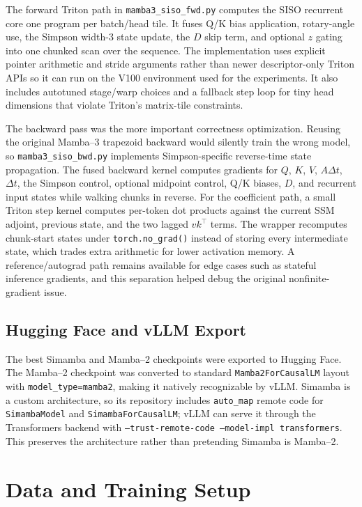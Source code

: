\documentclass[conference]{IEEEtran}
\newcommand{\modelname}{Simamba\xspace}
\newcommand{\mambatwo}{Mamba--2\xspace}
\newcommand{\mambathree}{Mamba--3\xspace}
\begin{document}
The forward Triton path in \texttt{mamba3\_siso\_fwd.py} computes the SISO recurrent core one program per batch/head tile. It fuses Q/K bias application, rotary-angle use, the Simpson width-3 state update, the $D$ skip term, and optional $z$ gating into one chunked scan over the sequence. The implementation uses explicit pointer arithmetic and stride arguments rather than newer descriptor-only Triton APIs so it can run on the V100 environment used for the experiments. It also includes autotuned stage/warp choices and a fallback step loop for tiny head dimensions that violate Triton's matrix-tile constraints.

The backward pass was the more important correctness optimization. Reusing the original \mambathree trapezoid backward would silently train the wrong model, so \texttt{mamba3\_siso\_bwd.py} implements Simpson-specific reverse-time state propagation. The fused backward kernel computes gradients for $Q$, $K$, $V$, $A\Delta t$, $\Delta t$, the Simpson control, optional midpoint control, Q/K biases, $D$, and recurrent input states while walking chunks in reverse. For the coefficient path, a small Triton step kernel computes per-token dot products against the current SSM adjoint, previous state, and the two lagged $vk^\top$ terms. The wrapper recomputes chunk-start states under \texttt{torch.no\_grad()} instead of storing every intermediate state, which trades extra arithmetic for lower activation memory. A reference/autograd path remains available for edge cases such as stateful inference gradients, and this separation helped debug the original nonfinite-gradient issue.

\subsection{Hugging Face and vLLM Export}

The best \modelname and \mambatwo checkpoints were exported to Hugging Face. The \mambatwo checkpoint was converted to standard \texttt{Mamba2ForCausalLM} layout with \texttt{model\_type=mamba2}, making it natively recognizable by vLLM. \modelname is a custom architecture, so its repository includes \texttt{auto\_map} remote code for \texttt{SimambaModel} and \texttt{SimambaForCausalLM}; vLLM can serve it through the Transformers backend with \texttt{--trust-remote-code --model-impl transformers}. This preserves the architecture rather than pretending \modelname is \mambatwo.

\section{Data and Training Setup}
\end{document}
